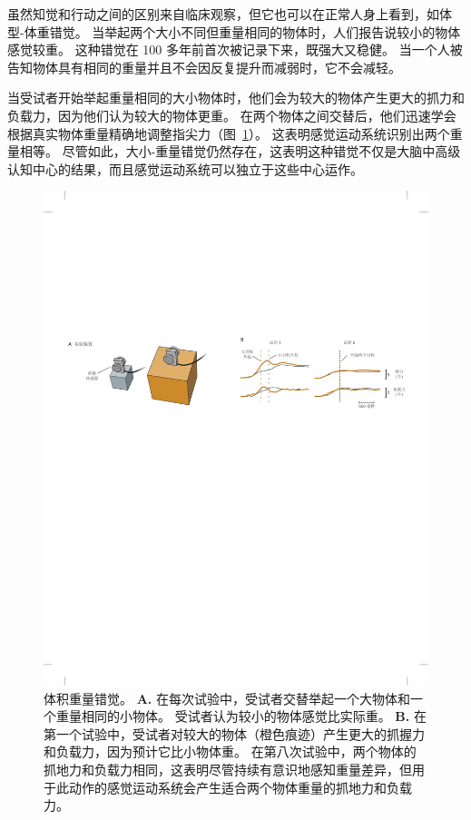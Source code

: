 虽然知觉和行动之间的区别来自临床观察，但它也可以在正常人身上看到，如体型-体重错觉。
当举起两个大小不同但重量相同的物体时，人们报告说较小的物体感觉较重。
这种错觉在 100 多年前首次被记录下来，既强大又稳健。
当一个人被告知物体具有相同的重量并且不会因反复提升而减弱时，它不会减轻。


当受试者开始举起重量相同的大小物体时，他们会为较大的物体产生更大的抓力和负载力，因为他们认为较大的物体更重。 
在两个物体之间交替后，他们迅速学会根据真实物体重量精确地调整指尖力（图~\ref{fig:30_7}）。 
这表明感觉运动系统识别出两个重量相等。
尽管如此，大小-重量错觉仍然存在，这表明这种错觉不仅是大脑中高级认知中心的结果，而且感觉运动系统可以独立于这些中心运作。


\begin{figure}[htbp]
	\centering
	\includegraphics[width=1.0\linewidth]{chap30/fig_30_7}
	\caption{体积重量错觉。
		\textbf{A.} 在每次试验中，受试者交替举起一个大物体和一个重量相同的小物体。
		受试者认为较小的物体感觉比实际重。
		\textbf{B.} 在第一个试验中，受试者对较大的物体（橙色痕迹）产生更大的抓握力和负载力，因为预计它比小物体重。
		在第八次试验中，两个物体的抓地力和负载力相同，这表明尽管持续有意识地感知重量差异，但用于此动作的感觉运动系统会产生适合两个物体重量的抓地力和负载力\cite{flanagan2000independence}。}
	\label{fig:30_7}
\end{figure}



